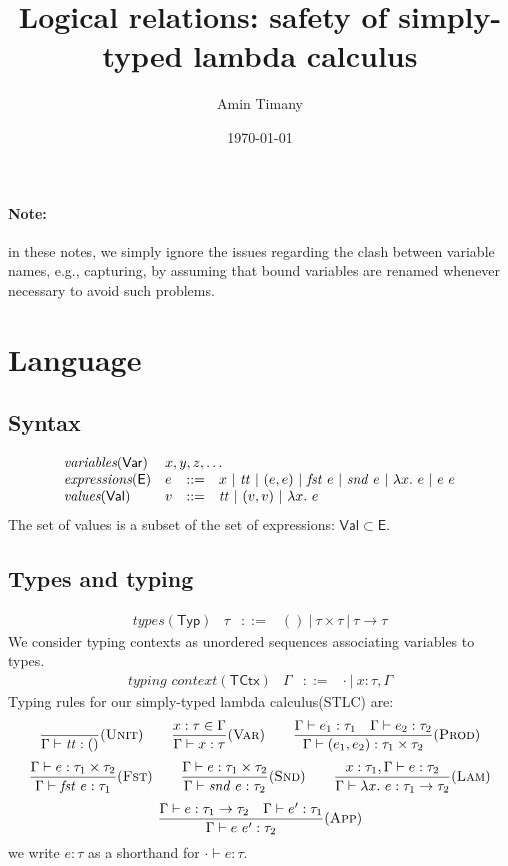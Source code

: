 \documentclass{article}
\title{Logical relations: safety of simply-typed lambda calculus}
\author{Amin Timany}
\date{\today}
\newcommand{\gor}{~|~}
\newcommand{\fst}{\mathit{fst}}
\newcommand{\snd}{\mathit{snd}}
\newcommand{\TT}{\mathit{tt}}
\newcommand{\VAR}{\mathsf{Var}}
\newcommand{\EXP}{\mathsf{E}}
\newcommand{\VAL}{\mathsf{Val}}
\newcommand{\TYP}{\mathsf{Typ}}
\newcommand{\UNT}{()}
\newcommand{\TCTX}{\mathsf{TCtx}}
\begin{document}
\maketitle

\paragraph{Note:} in these notes, we simply ignore the issues
regarding the clash between variable names, e.g., capturing, by
assuming that bound variables are renamed whenever necessary
to avoid such problems.

\section{Language}
\subsection{Syntax}
\[
\begin{array}{llll}
\textit{variables}(\VAR) & \multicolumn{3}{l}{x, y, z, \dots}\\
\textit{expressions}(\EXP) & e &::=& x \gor \TT \gor (e, e)
\gor \fst~e \gor \snd~e \gor \lambda x.~e \gor e~e\\
\textit{values}(\VAL) & v &::=& \TT \gor (v, v) \gor \lambda x.~e
\end{array}
\]
The set of values is a subset of the set of expressions: $\VAL \subset \EXP$.

\subsection{Types and typing}
\[
\begin{array}{llll}
\textit{types}(\TYP) & \tau &::=& \UNT \gor \tau \times \tau 
\gor \tau \to \tau
\end{array}
\]
We consider typing contexts as unordered sequences associating
variables to types.
\[
\begin{array}{llll}
\textit{typing context}(\TCTX) & \Gamma &::=& \cdot \gor x : \tau, \Gamma 
\end{array}
\]
Typing rules for our simply-typed lambda calculus(STLC) are:
\[
\frac{}{\Gamma \vdash \TT : \UNT}(\textsc{Unit})
\hspace{2em}
\frac{x : \tau \in \Gamma}{\Gamma \vdash x : \tau}(\textsc{Var})
\hspace{2em}
\frac{\Gamma \vdash e_1 : \tau_1 \hspace{1em}
\Gamma \vdash e_2 : \tau_2}{\Gamma \vdash (e_1, e_2) : \tau_1 \times \tau_2}(\textsc{Prod})
\]
\[
\frac{\Gamma \vdash e : \tau_1 \times \tau_2}{\Gamma \vdash \fst~e : \tau_1}(\textsc{Fst})
\hspace{2em}
\frac{\Gamma \vdash e : \tau_1 \times \tau_2}{\Gamma \vdash \snd~e : \tau_2}(\textsc{Snd})
\hspace{2em}
\frac{x : \tau_1, \Gamma \vdash e : \tau_2}{\Gamma \vdash \lambda x.~e : \tau_1 \to \tau_2}(\textsc{Lam})
\]
\[
\frac{\Gamma \vdash e : \tau_1 \to \tau_2 \hspace{1em}
\Gamma \vdash e' : \tau_1}{\Gamma \vdash e~e' : \tau_2}(\textsc{App})
\]
we write $e : \tau$ as a shorthand for $\cdot \vdash e : \tau$.
\end{document}
